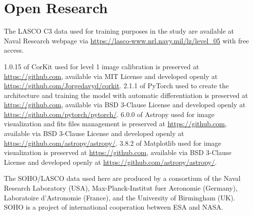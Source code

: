 \documentclass[draft]{agujournal2019}
\begin{document}
\section{Open Research}
The LASCO C3 data used for training purposes in the study are available at Naval Research webpage via \url{https://lasco-www.nrl.navy.mil/lz/level_05} with free access.

1.0.15 of CorKit used for level 1 image calibration is preserved at \url{https://github.com}, available via MIT License and developed openly at \url{https://github.com/Jorgedavyd/corkit}. 2.1.1 of PyTorch used to create the architecture and training the model with automatic differentiation is preserved at \url{https://github.com}, available via BSD 3-Clause License and developed openly at \url{https://github.com/pytorch/pytorch/}. 6.0.0 of Astropy used for image visualization and fits files management is preserved at \url{https://github.com}, available via BSD 3-Clause License and developed openly at \url{https://github.com/astropy/astropy/}. 3.8.2 of Matplotlib used for image visualization is preserved at \url{https://github.com}, available via BSD 3-Clause License and developed openly at \url{https://github.com/astropy/astropy/}.

\acknowledgments
The SOHO/LASCO data used here are produced by a consortium of the Naval Research Laboratory (USA), Max-Planck-Institut fuer Aeronomie (Germany), Laboratoire d'Astronomie (France), and the University of Birmingham (UK). SOHO is a project of international cooperation between ESA and NASA.
\end{document}
